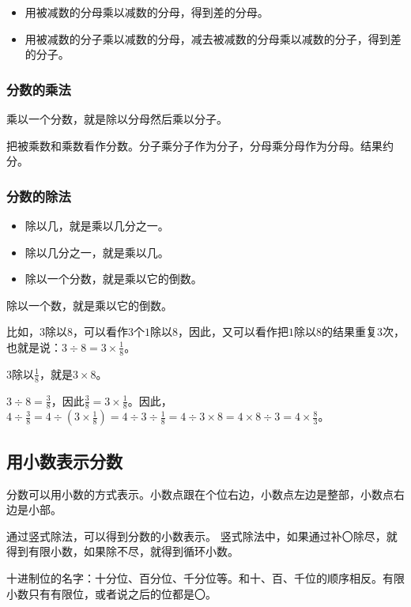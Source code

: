 \documentclass[12pt,UTF8]{ctexbook}
\begin{document}
\begin{itemize}
\item 用被减数的分母乘以减数的分母，得到差的分母。
\item 用被减数的分子乘以减数的分母，减去被减数的分母乘以减数的分子，得到差的分子。
\end{itemize}

\subsubsection{分数的乘法}

乘以一个分数，就是除以分母然后乘以分子。

把被乘数和乘数看作分数。分子乘分子作为分子，分母乘分母作为分母。结果约分。

\subsubsection{分数的除法}

\begin{itemize}
\item 除以几，就是乘以几分之一。
\item 除以几分之一，就是乘以几。
\item 除以一个分数，就是乘以它的倒数。
\end{itemize}

除以一个数，就是乘以它的倒数。

比如，\( 3 \)除以\( 8 \)，可以看作\( 3 \)个\( 1 \)除以\( 8 \)，因此，又可以看作把\( 1 \)除以\( 8 \)的结果重复\( 3 \)次，也就是说：\( 3\div 8 = 3\times \frac{1}{8} \)。

\( 3 \)除以\( \frac{1}{8} \)，就是\( 3\times 8 \)。

\( 3\div 8 = \frac{3}{8} \)，因此\( \frac{3}{8} = 3\times \frac{1}{8} \)。因此，\( 4\div \frac{3}{8} = 4\div \left(3 \times \frac{1}{8}\right) = 4\div 3 \div \frac{1}{8} = 4\div 3 \times 8 = 4\times 8 \div 3 = 4\times \frac{8}{3} \)。

\subsection{用小数表示分数}

分数可以用小数的方式表示。小数点跟在个位右边，小数点左边是整部，小数点右边是小部。

通过竖式除法，可以得到分数的小数表示。
竖式除法中，如果通过补〇除尽，就得到有限小数，如果除不尽，就得到循环小数。

十进制位的名字：十分位、百分位、千分位等。和十、百、千位的顺序相反。有限小数只有有限位，或者说之后的位都是〇。
\end{document}
